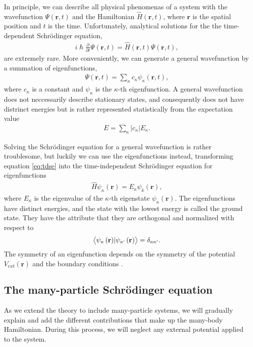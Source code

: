 In principle, we can describe all physical phenomenas of a system with the wavefunction $\Psi(\textbf{r},t)$ and the Hamiltonian $\hat{H}(\textbf{r},t)$, where $\textbf{r}$ is the spatial position and $t$ is the time. Unfortunately, analytical solutions for the the time-dependent Schrödinger equation,
\begin{align}
    i\hslash \frac{\partial}{\partial t} \Psi(\textbf{r},t) = \hat{H}(\textbf{r},t) \Psi(\textbf{r},t),
    \label{eq:tdse}
\end{align}
are extremely rare. More conveniently, we can generate a general wavefunction by a summation of eigenfunctions,
\begin{align}
  \Psi(\textbf{r},t) = \sum_\kappa c_\kappa \psi_\kappa(\textbf{r},t),
\end{align}
where $c_\kappa$ is a constant and $\psi_\kappa$ is the $\kappa$-th eigenfunction. A general wavefunction does not neccessarily describe stationary states, and consequently does not have distrinct energies but is rather represented statistically from the expectation value
\begin{align}
  E = \sum_\kappa \lvert c_\kappa \rvert E_\kappa.
\end{align}

 Solving the Schrödinger equation for a general wavefunction is rather troublesome, but luckily we can use the eigenfunctions instead, transforming equation \ref{eq:tdse} into the time-independent Schrödinger equation for eigenfunctions
\begin{align}
  \hat{H}\psi_\kappa(\textbf{r}) = E_\kappa \psi_k(\textbf{r}),
\end{align}
where $E_\kappa$ is the eigenvalue of the $\kappa$-th eigenstate $\psi_\kappa(\textbf{r})$. The eigenfunctions have distinct energies, and the state with the lowest energy is called the ground state. They have the attribute that they are orthogonal and normalized with respect to
\begin{align}
  \left \langle \psi_\kappa \left(\textbf{r}\right) \rvert \psi_{\kappa`} \left(\textbf{r} \right) \right \rangle = \delta_{\kappa \kappa'}.
\end{align}
The symmetry of an eigenfunction depends on the symmetry of the potential $V_{ext}(\textbf{r})$ and the boundary conditions \cite{Persson2020}.

\subsection{The many-particle Schrödinger equation}
As we extend the theory to include many-particle systems, we will gradually explain and add the different contributions that make up the many-body Hamiltonian. During this process, we will neglect any external potential applied to the system.

